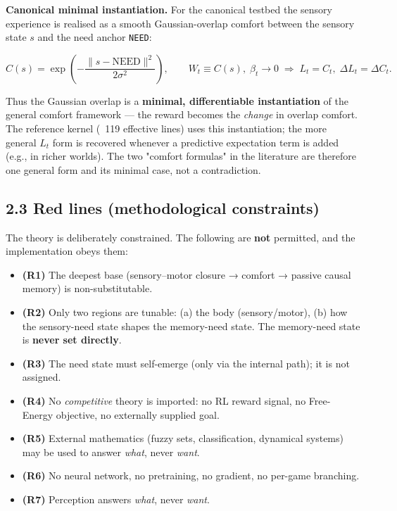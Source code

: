 \documentclass[11pt]{article}
\begin{document}
\textbf{Canonical minimal instantiation.} For the canonical testbed the sensory experience is realised as a smooth Gaussian-overlap comfort between the sensory state $s$ and the need anchor \texttt{NEED}:

\[
C(s)=\exp\!\left(-\frac{\|s-\text{NEED}\|^{2}}{2\sigma^{2}}\right),
\qquad W_t\equiv C(s),\;\beta_t\to 0 \;\Rightarrow\; L_t=C_t,\;
\Delta L_t=\Delta C_t.
\]

Thus the Gaussian overlap is a \textbf{minimal, differentiable instantiation} of the general comfort framework — the reward becomes the \emph{change} in overlap comfort. The reference kernel (~119 effective lines) uses this instantiation; the more general $L_t$ form is recovered whenever a predictive expectation term is added (e.g., in richer worlds). The two "comfort formulas" in the literature are therefore one general form and its minimal case, not a contradiction.

\subsection{2.3 Red lines (methodological constraints)}
The theory is deliberately constrained. The following are \textbf{not} permitted, and the implementation obeys them:
\begin{itemize}
\item \textbf{(R1)} The deepest base (sensory–motor closure → comfort → passive causal memory) is non-substitutable.
\item \textbf{(R2)} Only two regions are tunable: (a) the body (sensory/motor), (b) how the sensory-need state shapes the memory-need state. The memory-need state is \textbf{never set directly}.
\item \textbf{(R3)} The need state must self-emerge (only via the internal path); it is not assigned.
\item \textbf{(R4)} No \emph{competitive} theory is imported: no RL reward signal, no Free-Energy objective, no externally supplied goal.
\item \textbf{(R5)} External mathematics (fuzzy sets, classification, dynamical systems) may be used to answer \emph{what}, never \emph{want}.
\item \textbf{(R6)} No neural network, no pretraining, no gradient, no per-game branching.
\item \textbf{(R7)} Perception answers \emph{what}, never \emph{want}.
\end{itemize}
\end{document}
